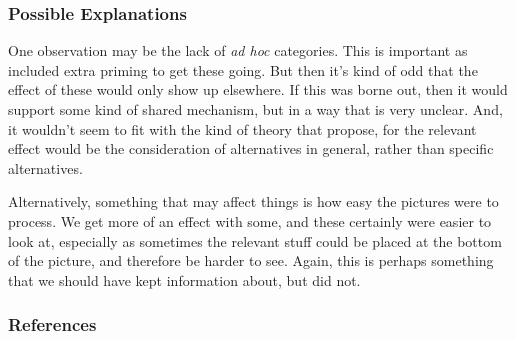 \documentclass[noamssymb]{beamer}
\begin{document}
  \begin{frame}
  \frametitle{{\ftf Possible Explanations}}
  One observation may be the lack of \emph{ad hoc} categories.
  This is important as \citeauthor{Bott:2016aa} included extra priming to get these going.
  But then it's kind of odd that the effect of these would only show up elsewhere.
  If this was borne out, then it would support some kind of shared mechanism, but in a way that is very unclear.
  And, it wouldn't seem to fit with the kind of theory that \citeauthor{Bott:2016aa} propose, for the relevant effect would be the consideration of alternatives in general, rather than specific alternatives.

  Alternatively, something that may affect things is how easy the pictures were to process.
  We get more of an effect with some, and these certainly were easier to look at, especially as sometimes the relevant stuff could be placed at the bottom of the picture, and therefore be harder to see.
  Again, this is perhaps something that we should have kept information about, but did not.

\end{frame}

\begin{frame}
  \frametitle{{\ftf References}}
  \printbibliography
\end{frame}
\end{document}
